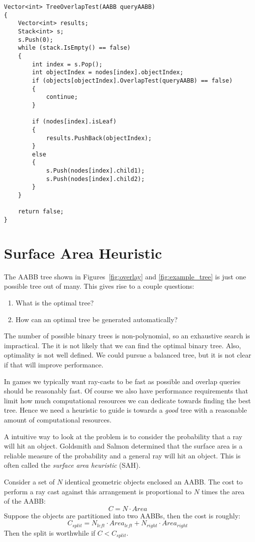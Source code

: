 \documentclass{article}
\begin{document}
\begin{lstlisting}[caption={Tree overlap test}, label={lst:tree_overlap}, float]
Vector<int> TreeOverlapTest(AABB queryAABB)
{
	Vector<int> results;
	Stack<int> s;
	s.Push(0);
	while (stack.IsEmpty() == false)
	{
		int index = s.Pop();
		int objectIndex = nodes[index].objectIndex;
		if (objects[objectIndex].OverlapTest(queryAABB) == false)
		{
			continue;
		}

		if (nodes[index].isLeaf)
		{
			results.PushBack(objectIndex);
		}
		else
		{
			s.Push(nodes[index].child1);
			s.Push(nodes[index].child2);
		}
	}

	return false;
}
\end{lstlisting}

\section{Surface Area Heuristic}
The AABB tree shown in Figures~\ref{fig:overlay} and \ref{fig:example_tree} is just one possible tree out of many. This gives rise to a couple questions:
\begin{enumerate}
	\item What is the optimal tree?
	\item How can an optimal tree be generated automatically?
\end{enumerate}
The number of possible binary trees is non-polynomial, so an exhaustive search is impractical. The it is not likely that we can find the optimal binary tree. Also, optimality is not well defined. We could pursue a balanced tree, but it is not clear if that will improve performance.

In games we typically want ray-casts to be fast as possible and overlap queries should be reasonably fast. Of course we also have performance requirements that limit how much computational resources we can dedicate towards finding the best tree. Hence we need a heuristic to guide is towards a \emph{good} tree with a reasonable amount of computational resources.

A intuitive way to look at the problem is to consider the probability that a ray will hit an object. Goldsmith and Salmon determined that the surface area is a reliable measure of the probability and a general ray will hit an object. This is often called the \emph{surface area heuristic} (SAH).

Consider a set of $N$ identical geometric objects enclosed an AABB. The cost to perform a ray cast against this arrangement is proportional to $N$ times the area of the AABB:
\[ C = N \cdot Area \]
Suppose the objects are partitioned into two AABBs, then the cost is roughly:
\[ C_{split} = N_{left} \cdot Area_{left} + N_{right} \cdot Area_{right} \]
Then the split is worthwhile if $C < C_{split}$.
\end{document}

